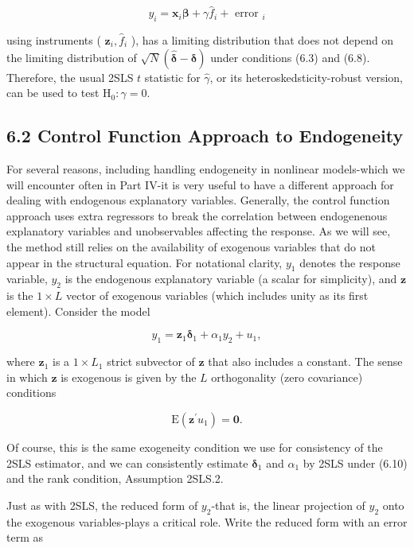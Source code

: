 \documentclass[10pt]{article}
\begin{document}
$$
y_{i}=\mathbf{x}_{i} \boldsymbol{\beta}+\gamma \hat{f}_{i}+\text { error }_{i}
$$

using instruments ( $\mathbf{z}_{i}, \hat{f}_{i}$ ), has a limiting distribution that does not depend on the limiting distribution of $\sqrt{N}(\hat{\boldsymbol{\delta}}-\boldsymbol{\delta})$ under conditions (6.3) and (6.8). Therefore, the usual 2SLS $t$ statistic for $\hat{\gamma}$, or its heteroskedsticity-robust version, can be used to test $\mathrm{H}_{0}: \gamma=0$.

\subsection*{6.2 Control Function Approach to Endogeneity}
For several reasons, including handling endogeneity in nonlinear models-which we will encounter often in Part IV-it is very useful to have a different approach for dealing with endogenous explanatory variables. Generally, the control function approach uses extra regressors to break the correlation between endogenenous explanatory variables and unobservables affecting the response. As we will see, the method still relies on the availability of exogenous variables that do not appear in the structural equation. For notational clarity, $y_{1}$ denotes the response variable, $y_{2}$ is the endogenous explanatory variable (a scalar for simplicity), and $\mathbf{z}$ is the $1 \times L$ vector of exogenous variables (which includes unity as its first element). Consider the model


\begin{equation*}
y_{1}=\mathbf{z}_{1} \boldsymbol{\delta}_{1}+\alpha_{1} y_{2}+u_{1}, \tag{6.9}
\end{equation*}


where $\mathbf{z}_{1}$ is a $1 \times L_{1}$ strict subvector of $\mathbf{z}$ that also includes a constant. The sense in which $\mathbf{z}$ is exogenous is given by the $L$ orthogonality (zero covariance) conditions


\begin{equation*}
\mathrm{E}\left(\mathbf{z}^{\prime} u_{1}\right)=\mathbf{0} . \tag{6.10}
\end{equation*}


Of course, this is the same exogeneity condition we use for consistency of the 2SLS estimator, and we can consistently estimate $\boldsymbol{\delta}_{1}$ and $\alpha_{1}$ by 2SLS under (6.10) and the rank condition, Assumption 2SLS.2.

Just as with 2SLS, the reduced form of $y_{2}$-that is, the linear projection of $y_{2}$ onto the exogenous variables-plays a critical role. Write the reduced form with an error term as
\end{document}
